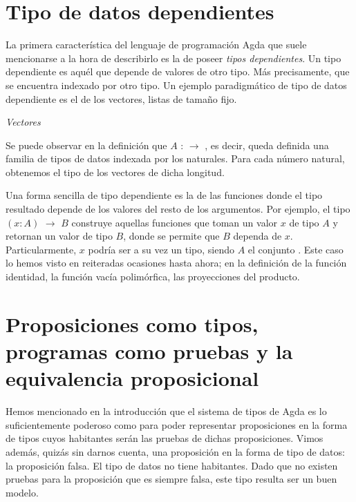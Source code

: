 \section{Tipo de datos dependientes}

La primera característica del lenguaje de programación Agda que suele mencionarse a la hora de describirlo es la de poseer {\it tipos dependientes}. Un tipo dependiente es aquél que depende de valores de otro tipo. Más precisamente, que se encuentra indexado por otro tipo. Un ejemplo paradigmático de tipo de datos dependiente es el de los vectores, listas de tamaño fijo. 
\begin{agdacode}{\it Vectores}\label{code:Vec}

\end{agdacode}

Se puede observar en la definición que  $A$ : \AgdaDatatype{$\Nat$} $\to$ , es decir, queda definida una familia de tipos de datos indexada por los naturales. Para cada número natural, obtenemos el tipo de los vectores de dicha longitud.

Una forma sencilla de tipo dependiente es la de las funciones donde el tipo resultado depende de los valores del resto de los argumentos. Por ejemplo, el tipo $(x : A)$ $\to$ $B$ construye aquellas funciones que toman un valor $x$ de tipo $A$ y retornan un valor de tipo $B$, donde se permite que $B$ dependa de $x$. Particularmente, $x$ podría ser a su vez un tipo, siendo $A$ el conjunto . Este caso lo hemos visto en reiteradas ocasiones hasta ahora; en la definición de la función identidad, la función vacía polimórfica, las proyecciones del producto.

\section[Proposiciones como tipos y la equivalencia proposicional]{Proposiciones como tipos, programas como pruebas y la equivalencia proposicional}\label{prop}

Hemos mencionado en la introducción que el sistema de tipos de Agda es lo suficientemente poderoso como para poder representar proposiciones en la forma de tipos cuyos habitantes serán las pruebas de dichas proposiciones. Vimos además, quizás sin darnos cuenta, una proposición en la forma de tipo de datos: la proposición falsa. El tipo de datos \AgdaDatatype{$\bot$} no tiene habitantes. Dado que no existen pruebas para la proposición que es siempre falsa, este tipo resulta ser un buen modelo.


